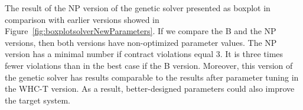 \begin{table}
	\centering
	\caption{Parameters of NP and NP-T versions of the genetic solver}\label{tab:Parameters_NP-T}
\end{table}

The result of the NP version of the genetic solver presented as boxplot in comparison with earlier versions showed in Figure~\ref{fig:boxplotsolverNewParameters}. If we compare the B and the NP versions, then both versions have non-optimized parameter values. The NP version has a minimal number if contract violations equal 3. It is three times fewer violations than in the best case if the B version. Moreover, this version of the genetic solver has results comparable to the results after parameter tuning in the WHC-T version. As a result, better-designed parameters could also improve the target system. 

